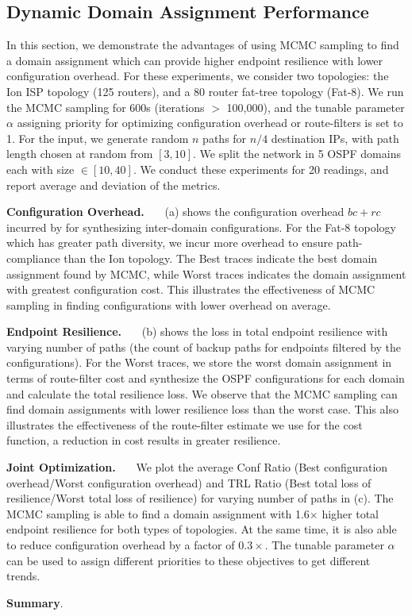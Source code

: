 \subsection{Dynamic Domain Assignment Performance} \label{sec:mcmceval}
In this section, we demonstrate the advantages of using MCMC sampling
to find a domain assignment which can provide higher endpoint resilience
with lower configuration overhead. For these experiments, we consider 
two topologies: the Ion ISP topology (125 routers), and a 80 router 
fat-tree topology (Fat-8). We run the MCMC sampling for 600s (iterations
$>$ 100,000), and the tunable parameter $\alpha$ assigning priority for 
optimizing configuration overhead or route-filters is set to 1. For 
the input, we generate random $n$ paths for $n/4$ destination IPs, with
path length chosen at random from $[3,10]$. We split the network
in 5 OSPF domains each with size $\in [10,40]$. We conduct these
experiments for 20 readings, and report average and deviation of the metrics. 

\noindent\textbf{Configuration Overhead.}~~~
(a) shows the configuration overhead $bc + rc$ 
incurred by \name for synthesizing inter-domain configurations.
For the Fat-8 topology which has greater path diversity, we incur more 
overhead to ensure path-compliance than the Ion topology. 
The Best traces indicate the best domain assignment found by MCMC, while 
Worst traces indicates the domain assignment with greatest 
configuration cost. 
This illustrates
the effectiveness of MCMC sampling in finding configurations with lower overhead on average.

\noindent\textbf{Endpoint Resilience.}~~~
(b) shows the loss in total endpoint resilience
with varying number of paths (the count 
of backup paths for endpoints filtered by the configurations). For the
Worst traces, we store the worst domain assignment in terms of route-filter
cost and synthesize the OSPF configurations for each domain and calculate
the total resilience loss. We observe that 
the MCMC sampling can find domain 
assignments with lower resilience loss than the worst case. This 
also illustrates the effectiveness of the route-filter estimate we use
for the cost function, a reduction in cost results in greater resilience. 

\noindent\textbf{Joint Optimization.}~~~
We plot the average Conf Ratio 
(Best configuration overhead/Worst configuration overhead) and TRL
Ratio (Best total loss of resilience/Worst total loss of resilience)
for varying number of paths in (c). The MCMC
sampling is able to find a domain assignment
with 1.6$\times$ higher total endpoint resilience for both types
of topologies. At the same time, it is also able to reduce configuration
overhead by a factor of $0.3\times$. The tunable parameter $\alpha$ 
can be used to assign different priorities to these objectives to get
different trends. 

\noindent\textbf{Summary}.
